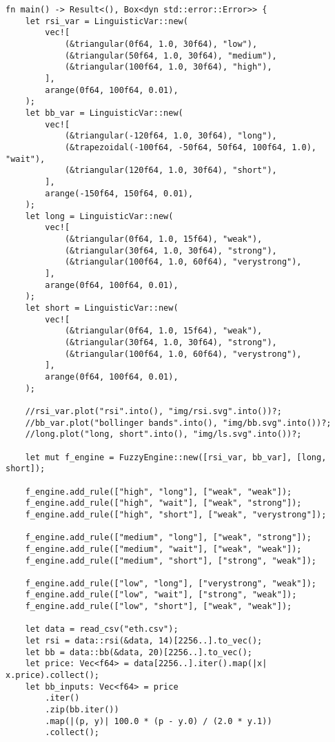 \begin{verbatim}
fn main() -> Result<(), Box<dyn std::error::Error>> {
    let rsi_var = LinguisticVar::new(
        vec![
            (&triangular(0f64, 1.0, 30f64), "low"),
            (&triangular(50f64, 1.0, 30f64), "medium"),
            (&triangular(100f64, 1.0, 30f64), "high"),
        ],
        arange(0f64, 100f64, 0.01),
    );
    let bb_var = LinguisticVar::new(
        vec![
            (&triangular(-120f64, 1.0, 30f64), "long"),
            (&trapezoidal(-100f64, -50f64, 50f64, 100f64, 1.0), "wait"),
            (&triangular(120f64, 1.0, 30f64), "short"),
        ],
        arange(-150f64, 150f64, 0.01),
    );
    let long = LinguisticVar::new(
        vec![
            (&triangular(0f64, 1.0, 15f64), "weak"),
            (&triangular(30f64, 1.0, 30f64), "strong"),
            (&triangular(100f64, 1.0, 60f64), "verystrong"),
        ],
        arange(0f64, 100f64, 0.01),
    );
    let short = LinguisticVar::new(
        vec![
            (&triangular(0f64, 1.0, 15f64), "weak"),
            (&triangular(30f64, 1.0, 30f64), "strong"),
            (&triangular(100f64, 1.0, 60f64), "verystrong"),
        ],
        arange(0f64, 100f64, 0.01),
    );

    //rsi_var.plot("rsi".into(), "img/rsi.svg".into())?;
    //bb_var.plot("bollinger bands".into(), "img/bb.svg".into())?;
    //long.plot("long, short".into(), "img/ls.svg".into())?;

    let mut f_engine = FuzzyEngine::new([rsi_var, bb_var], [long, short]);

    f_engine.add_rule(["high", "long"], ["weak", "weak"]);
    f_engine.add_rule(["high", "wait"], ["weak", "strong"]);
    f_engine.add_rule(["high", "short"], ["weak", "verystrong"]);

    f_engine.add_rule(["medium", "long"], ["weak", "strong"]);
    f_engine.add_rule(["medium", "wait"], ["weak", "weak"]);
    f_engine.add_rule(["medium", "short"], ["strong", "weak"]);

    f_engine.add_rule(["low", "long"], ["verystrong", "weak"]);
    f_engine.add_rule(["low", "wait"], ["strong", "weak"]);
    f_engine.add_rule(["low", "short"], ["weak", "weak"]);

    let data = read_csv("eth.csv");
    let rsi = data::rsi(&data, 14)[2256..].to_vec();
    let bb = data::bb(&data, 20)[2256..].to_vec();
    let price: Vec<f64> = data[2256..].iter().map(|x| x.price).collect();
    let bb_inputs: Vec<f64> = price
        .iter()
        .zip(bb.iter())
        .map(|(p, y)| 100.0 * (p - y.0) / (2.0 * y.1))
        .collect();


\end{verbatim}
